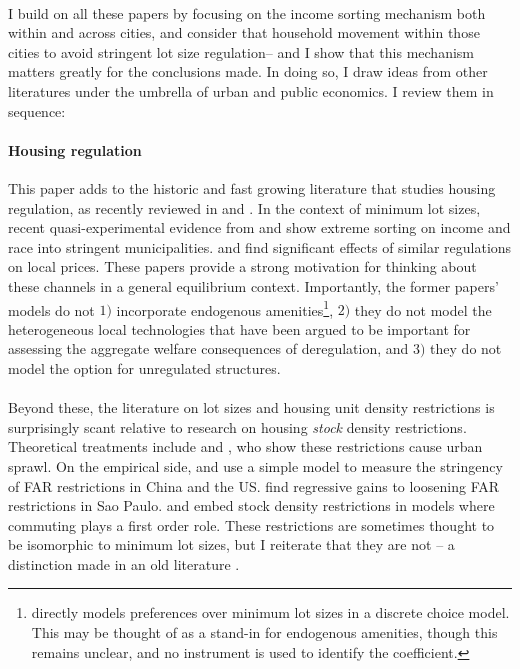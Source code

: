 \documentclass[]{article}
\begin{document}
\paragraph*{}
I build on all these papers by focusing on the income sorting mechanism both within and across cities, and consider that household movement within those cities to avoid stringent lot size regulation-- and I show that this mechanism matters greatly for the conclusions made. In doing so, I draw ideas from other literatures under the umbrella of urban and public economics. I review them in sequence:

\paragraph*{Housing regulation} This paper adds to the historic and fast growing literature that studies housing regulation, as recently reviewed in \cite{gyourkomolloy} and \cite{MolloyRSUE}. In the context of minimum lot sizes, recent quasi-experimental evidence from \cite{Song} and \cite{kulka} show extreme sorting on income and race into stringent municipalities. \cite{KSC} and \cite{zabel} find significant effects of similar regulations on local prices. These papers provide a strong motivation for thinking about these channels in a general equilibrium context. Importantly, the former papers' models do not $1)$ incorporate endogenous amenities\footnote{\cite{Song} directly models preferences over minimum lot sizes in a discrete choice model. This may be thought of as a stand-in for endogenous amenities, though this remains unclear, and no instrument is used to identify the coefficient.}, $2)$ they do not model the heterogeneous local technologies that have been argued to be important for assessing the aggregate welfare consequences of deregulation, and $3)$ they do not model the option for unregulated structures.
\paragraph*{}
Beyond these, the literature on lot sizes and housing unit density restrictions is surprisingly scant relative to research on housing \textit{stock} density restrictions. Theoretical treatments include \cite{bbheight} and \cite{mills2005}, who show these restrictions cause urban sprawl. On the empirical side, \cite{BruecknerFuGu} and \cite{bruecknersingh} use a simple model to measure the stringency of FAR restrictions in China and the US. \cite{anagoletal2021} find regressive gains to loosening FAR restrictions in Sao Paulo. \cite{martynov} and \cite{acosta} embed stock density restrictions in models where commuting plays a first order role. These restrictions are sometimes thought to be isomorphic to minimum lot sizes, but I reiterate that they are not --  a distinction made in an old literature \citep{griesonwhite}.
\end{document}
